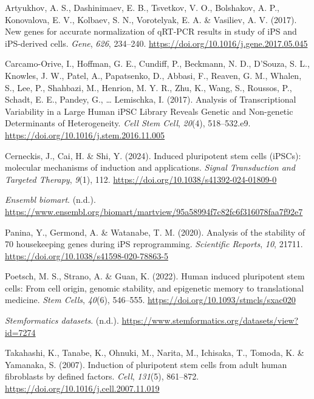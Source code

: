 \documentclass[
  letterpaper,
  DIV=11,
  numbers=noendperiod]{scrartcl}
\newlength{\cslhangindent}
\newenvironment{CSLReferences}[2] %
 {\begin{list}{}{%
  \setlength{\itemindent}{0pt}
  \setlength{\leftmargin}{0pt}
  \setlength{\parsep}{0pt}
  \ifodd #1
   \setlength{\leftmargin}{\cslhangindent}
   \setlength{\itemindent}{-1\cslhangindent}
  \fi
  \setlength{\itemsep}{#2\baselineskip}}}
 {\end{list}}
\begin{document}
\label{refs}
\begin{CSLReferences}{1}{0}
Artyukhov, A. S., Dashinimaev, E. B., Tsvetkov, V. O., Bolshakov, A. P.,
Konovalova, E. V., Kolbaev, S. N., Vorotelyak, E. A. \& Vasiliev, A. V.
(2017). New genes for accurate normalization of qRT-PCR results in study
of iPS and iPS-derived cells. \emph{Gene}, \emph{626}, 234--240.
\url{https://doi.org/10.1016/j.gene.2017.05.045}

Carcamo-Orive, I., Hoffman, G. E., Cundiff, P., Beckmann, N. D.,
D'Souza, S. L., Knowles, J. W., Patel, A., Papatsenko, D., Abbasi, F.,
Reaven, G. M., Whalen, S., Lee, P., Shahbazi, M., Henrion, M. Y. R.,
Zhu, K., Wang, S., Roussos, P., Schadt, E. E., Pandey, G., \ldots{}
Lemischka, I. (2017). Analysis of Transcriptional Variability in a Large
Human iPSC Library Reveals Genetic and Non-genetic Determinants of
Heterogeneity. \emph{Cell Stem Cell}, \emph{20}(4), 518--532.e9.
\url{https://doi.org/10.1016/j.stem.2016.11.005}

Cerneckis, J., Cai, H. \& Shi, Y. (2024). Induced pluripotent stem cells
(iPSCs): molecular mechanisms of induction and applications.
\emph{Signal Transduction and Targeted Therapy}, \emph{9}(1), 112.
\url{https://doi.org/10.1038/s41392-024-01809-0}

\emph{Ensembl biomart}. (n.d.).
\url{https://www.ensembl.org/biomart/martview/95a58994f7c82fc6f316078faa7f92e7}

Panina, Y., Germond, A. \& Watanabe, T. M. (2020). Analysis of the
stability of 70 housekeeping genes during iPS reprogramming.
\emph{Scientific Reports}, \emph{10}, 21711.
\url{https://doi.org/10.1038/s41598-020-78863-5}

Poetsch, M. S., Strano, A. \& Guan, K. (2022). Human induced pluripotent
stem cells: From cell origin, genomic stability, and epigenetic memory
to translational medicine. \emph{Stem Cells}, \emph{40}(6), 546--555.
\url{https://doi.org/10.1093/stmcls/sxac020}

\emph{Stemformatics datasets}. (n.d.).
\url{https://www.stemformatics.org/datasets/view?id=7274}

Takahashi, K., Tanabe, K., Ohnuki, M., Narita, M., Ichisaka, T., Tomoda,
K. \& Yamanaka, S. (2007). Induction of pluripotent stem cells from
adult human fibroblasts by defined factors. \emph{Cell}, \emph{131}(5),
861--872. \url{https://doi.org/10.1016/j.cell.2007.11.019}


\end{CSLReferences}
\end{document}
